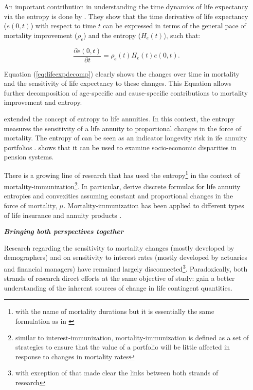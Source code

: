 \documentclass[12pt]{article}
\begin{document}
An important contribution in understanding the time dynamics of life expectancy via the entropy is done by \citet{Vaupel2003}. They show that the time derivative of life expectancy ($e(0,t)$) with respect to time $t$ can be expressed in terms of the general pace of mortality improvement ($\rho_{e}$) and the entropy ($H_{e}(t)$), such that:

\begin{equation}\label{eq:lifeexpdecomp}
	\dfrac{\partial e(0,t)}{\partial t}= \rho_{e}(t)H_{e}(t)e(0,t).
\end{equation}


Equation (\ref{eq:lifeexpdecomp}) clearly shows the changes over time in mortality and the sensitivity of life expectancy to these changes. This Equation allows further decomposition of age-specific and cause-specific contributions to mortality improvement and entropy.

\citet{Haberman2011} extended the concept of entropy to life annuities. In this context, the entropy measures the sensitivity of a life annuity to proportional changes in the force of mortality. The entropy of can be seen as an indicator longevity risk in ife annuity portfolios \citep{rabitti2020mortality}. \citet{alvarez2021linking} shows that it can be used to examine socio-economic disparities in pension systems.

There is a growing line of research that has used the entropy\footnote{with the name of mortality durations but it is essentially the same formulation as in \citet{Haberman2011}} in the context of mortality-immunization\footnote{similar to interest-immunization, mortality-immunization is defined as a set of strategies to ensure that the value of a portfolio will be little affected in response to changes in mortality rates}. In particular, \citet{wang2010optimal,tsai2011actuarial,Tsai2013a,Li2011} derive discrete formulas for life annuity entropies and convexities assuming constant and proportional changes in the force of mortality, $\mu$. Mortality-immunization has been applied to different types of life insurance and annuity products \citep{li2012key,Li2012,Wong2015,Luciano2015,levantesi2018natural}. 

\textit{\textbf{Bringing both perspectives together}}

Research regarding the sensitivity to mortality changes (mostly developed by demographers) and on sensitivity to interest rates (mostly developed by actuaries and financial managers) have remained largely disconnected\footnote{with exception of \citet{Haberman2011,rabitti2020mortality,alvarez2021linking} that made clear the links between both strands of research}. Paradoxically, both strands of research direct efforts at the same objective of study: gain a better understanding of the inherent sources of change in life contingent quantities.
\end{document}
